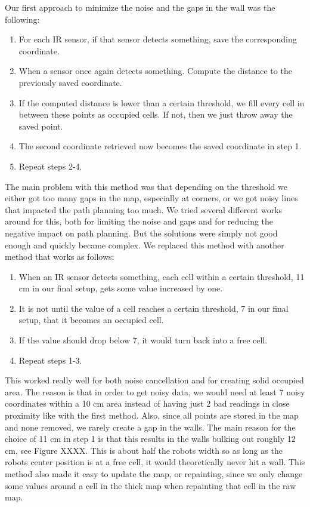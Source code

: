 Our first approach to minimize the noise and the gaps in the wall was the following:

\begin{enumerate}
\item For each IR sensor, if that sensor detects something, save the corresponding coordinate.
\item When a sensor once again detects something. Compute the distance to the previously saved coordinate.
\item If the computed distance is lower than a certain threshold, we fill every cell in between these points as occupied cells. If not, then we just throw away the saved point.
\item The second coordinate retrieved now becomes the saved coordinate in step 1.
\item Repeat steps 2-4.
\end{enumerate}

The main problem with this method was that depending on the threshold we either got too many gaps in the map, especially at corners, or we got noisy lines that impacted the path planning too much. We tried several different works around for this, both for limiting the noise and gaps and for reducing the negative impact on path planning. But the solutions were simply not good enough and quickly became complex. We replaced this method with another method that works as follows:

\begin{enumerate}
\item When an IR sensor detects something, each cell within a certain threshold, 11 cm in our final setup, gets some value increased by one. 
\item It is not until the value of a cell reaches a certain threshold, 7 in our final setup, that it becomes an occupied cell. 
\item If the value should drop below 7, it would turn back into a free cell.
\item Repeat steps 1-3. 
\end{enumerate}

This worked really well for both noise cancellation and for creating solid occupied area. The reason is that in order to get noisy data, we would need at least 7 noisy coordinates within a 10 cm area instead of having just 2 bad readings in close proximity like with the first method. Also, since all points are stored in the map and none removed, we rarely create a gap in the walls. The main reason for the choice of 11 cm in step 1 is that this results in the walls bulking out roughly 12 cm, see Figure XXXX. This is about half the robots width so as long as the robots center position is at a free cell, it would theoretically never hit a wall. This method also made it easy to update the map, or repainting, since we only change some values around a cell in the thick map when repainting that cell in the raw map.

